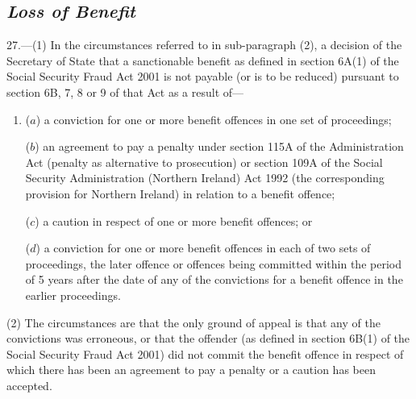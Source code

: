 \documentclass[12pt,a4paper]{article}
\begin{document}
\subsection*{\itshape Loss of Benefit}

27.—(1) In the circumstances referred to in sub-paragraph (2), a decision of the Secretary of State that a sanctionable benefit as defined in section 6A(1) of the Social Security Fraud Act 2001 is not payable (or is to be reduced) pursuant to section 6B, 7, 8 or 9 of that Act as a result of—
\begin{enumerate}\item[]
($a$) a conviction for one or more benefit offences in one set of proceedings;

($b$) an agreement to pay a penalty under section 115A of the Administration Act (penalty as alternative to prosecution) or section 109A of the Social Security Administration (Northern Ireland) Act 1992 (the corresponding provision for Northern Ireland) in relation to a benefit offence;

($c$) a caution in respect of one or more benefit offences; or

($d$) a conviction for one or more benefit offences in each of two sets of proceedings, the later offence or offences being committed within the period of 5 years after the date of any of the convictions for a benefit offence in the earlier proceedings.
\end{enumerate}

(2) The circumstances are that the only ground of appeal is that any of the convictions was erroneous, or that the offender (as defined in section 6B(1) of the Social Security Fraud Act 2001) did not commit the benefit offence in respect of which there has been an agreement to pay a penalty or a caution has been accepted.

\end{document}
